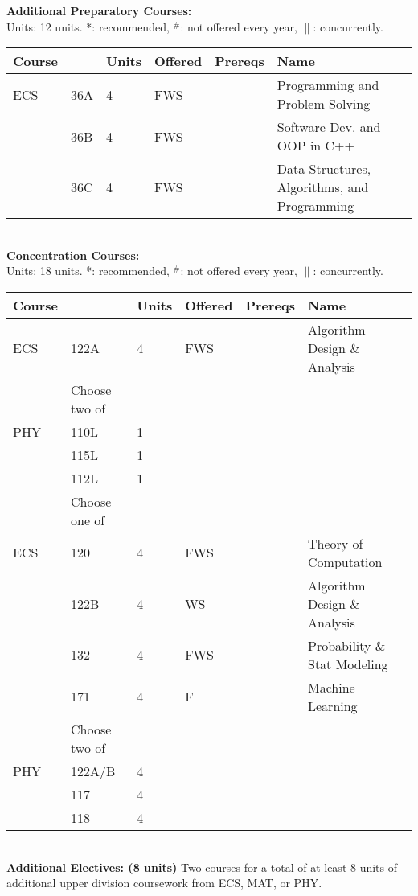 \documentclass[12pt]{article}
\begin{document}
\newpage
{}
\vskip 0.25cm
\noindent
{\bf Additional Preparatory Courses:  }\\
Units:  12 units. *: recommended, $^\#$: not offered every year, $\parallel$: concurrently.\\
\begin{tabular}{|llllll|}
\hline
Course & & Units & Offered & Prereqs & Name \\
\hline
ECS & 36A  & 4 & FWS & & Programming and Problem Solving\\
    & 36B  & 4 & FWS & & Software Dev. and OOP in C++\\
    & 36C  & 4 & FWS & & Data Structures, Algorithms, and Programming\\
\hline
\end{tabular}\\
\vskip 0.25cm
\noindent
{\bf Concentration Courses:  }\\
Units:  18 units. *: recommended, $^\#$: not offered every year, $\parallel$: concurrently.\\
\begin{tabular}{|llllll|}
\hline
Course & & Units & Offered & Prereqs & Name \\
\hline
ECS & 122A & 4 & FWS & & Algorithm Design \& Analysis\\
\hline
\hline
    & Choose two of & & & & \\
\hline
PHY    & 110L & 1 & & & \\
    & 115L & 1 & & & \\
    & 112L & 1 & & & \\
\hline
\hline
    & Choose one of & & & & \\
\hline
ECS & 120  & 4 & FWS & & Theory of Computation \\
    & 122B & 4 & WS  & & Algorithm Design \& Analysis \\
    & 132  & 4 & FWS & & Probability \& Stat Modeling \\
    & 171  & 4 & F   & & Machine Learning \\
\hline
\hline
    & Choose two of & & & & \\
\hline
PHY & 122A/B & 4 & & & \\
    & 117   & 4 & & & \\
    & 118   & 4 & & & \\
\hline
\end{tabular}\\
\vskip 0.25cm
\noindent
{\bf Additional Electives: (8 units)} Two courses for a total of at least 8 units of additional upper division coursework from ECS, MAT, or PHY.\\
\end{document}
